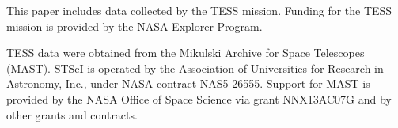 \documentclass[twocolumn]{aastex62}
\begin{document}
This paper includes data collected by the TESS mission. Funding for the TESS mission is provided by the NASA Explorer Program.

TESS data were obtained from the Mikulski Archive for Space Telescopes
(MAST).
STScI is operated by the Association of Universities for Research in
Astronomy, Inc., under NASA contract NAS5-26555.
Support for MAST is provided by the NASA Office of Space Science via grant
NNX13AC07G and by other grants and contracts.










\end{document}
